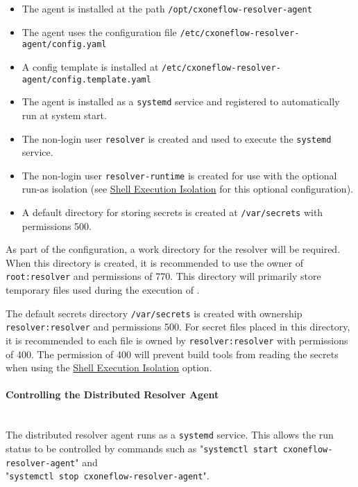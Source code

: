 \begin{itemize}
  \item The agent is installed at the path \texttt{/opt/cxoneflow-resolver-agent}
  \item The agent uses the configuration file \texttt{/etc/cxoneflow-resolver-agent/config.yaml}
  \item A config template is installed at \texttt{/etc/cxoneflow-resolver-agent/config.template.yaml}
  \item The agent is installed as a \texttt{systemd} service and registered to automatically run at system start.
  \item The non-login user \texttt{resolver} is created and used to execute the \texttt{systemd} service.
  \item The non-login user \texttt{resolver-runtime} is created for use with the optional run-as isolation
    (see \hyperref[par:shell-agent-isolation]{Shell Execution Isolation} for this optional configuration).
  \item A default directory for storing secrets is created at \texttt{/var/secrets} with permissions 500.
\end{itemize}

As part of the configuration, a work directory for the resolver will be required.  When this directory
is created, it is recommended to use the owner of \texttt{root:resolver} and permissions of 770.  This
directory will primarily store temporary files used during the execution of \scaresolver.

The default secrets directory \texttt{/var/secrets} is created with ownership \texttt{resolver:resolver} and
permissions 500.  For secret files placed in this directory, it is recommended to each file is owned
by \texttt{resolver:resolver} with permissions of 400.  The permission of 400 will prevent 
build tools from reading the secrets when using the \hyperref[par:shell-agent-isolation]{Shell Execution Isolation} option.

\paragraph{Controlling the Distributed Resolver Agent}
\noindent\\The distributed resolver agent runs as a \texttt{systemd} service.  This allows the run status to be controlled
by commands such as "\texttt{systemctl start cxoneflow-resolver-agent}" and\\"\texttt{systemctl stop cxoneflow-resolver-agent}".

